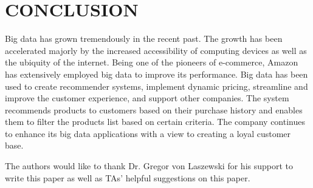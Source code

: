 \documentclass[sigconf]{acmart}
\begin{document}
\section{CONCLUSION}
Big data has grown tremendously in the recent past. The growth has been accelerated majorly by the increased accessibility of computing devices as well as the ubiquity of the internet. Being one of the pioneers of e-commerce, Amazon has extensively employed big data to improve its performance. Big data has been used to create recommender systems, implement dynamic pricing, streamline and improve the customer experience, and support other companies. The system recommends products to customers based on their purchase history and enables them to filter the products list based on certain criteria. The company continues to enhance its big data applications with a view to creating a loyal customer base. 

\begin{acks}

The authors would like to thank Dr. Gregor von Laszewski for his support to write this paper as well as TAs' helpful suggestions on this paper. 

\end{acks}


 
\end{document}
